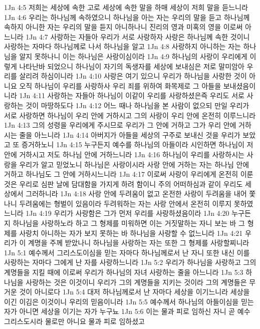 1Jn 4:5  저희는 세상에 속한 고로 세상에 속한 말을 하매 세상이 저희 말을 듣느니라
1Jn 4:6  우리는 하나님께 속하였으니 하나님을 아는 자는 우리의 말을 듣고 하나님께 속하지 아니한 자는 우리의 말을 듣지 아니하나니 진리의 영과 미혹의 영을 이로써 아느니라
1Jn 4:7  사랑하는 자들아 우리가 서로 사랑하자 사랑은 하나님께 속한 것이니 사랑하는 자마다 하나님께로 나서 하나님을 알고
1Jn 4:8  사랑하지 아니하는 자는 하나님을 알지 못하나니 이는 하나님은 사랑이심이라
1Jn 4:9  하나님의 사랑이 우리에게 이렇게 나타난바 되었으니 하나님이 자기의 독생자를 세상에 보내심은 저로 말미암아 우리를 살리려 하심이니라
1Jn 4:10  사랑은 여기 있으니 우리가 하나님을 사랑한 것이 아니요 오직 하나님이 우리를 사랑하사 우리 죄를 위하여 화목제로 그 아들을 보내셨음이니라
1Jn 4:11  사랑하는 자들아 하나님이 이같이 우리를 사랑하셨은즉 우리도 서로 사랑하는 것이 마땅하도다
1Jn 4:12  어느 때나 하나님을 본 사람이 없으되 만일 우리가 서로 사랑하면 하나님이 우리 안에 거하시고 그의 사랑이 우리 안에 온전히 이루느니라
1Jn 4:13  그의 성령을 우리에게 주시므로 우리가 그 안에 거하고 그가 우리 안에 거하시는 줄을 아느니라
1Jn 4:14  아버지가 아들을 세상의 구주로 보내신 것을 우리가 보았고 또 증거하노니
1Jn 4:15  누구든지 예수를 하나님의 아들이라 시인하면 하나님이 저 안에 거하시고 저도 하나님 안에 거하느니라
1Jn 4:16  하나님이 우리를 사랑하시는 사랑을 우리가 알고 믿었노니 하나님은 사랑이시라 사랑 안에 거하는 자는 하나님 안에 거하고 하나님도 그 안에 거하시느니라
1Jn 4:17  이로써 사랑이 우리에게 온전히 이룬 것은 우리로 심판 날에 담대함을 가지게 하려 함이니 주의 어떠하심과 같이 우리도 세상에서 그러하니라
1Jn 4:18  사랑 안에 두려움이 없고 온전한 사랑이 두려움을 내어 쫓나니 두려움에는 형벌이 있음이라 두려워하는 자는 사랑 안에서 온전히 이루지 못하였느니라
1Jn 4:19  우리가 사랑함은 그가 먼저 우리를 사랑하셨음이라
1Jn 4:20  누구든지 하나님을 사랑하노라 하고 그 형제를 미워하면 이는 거짓말하는 자니 보는 바 그 형제를 사랑치 아니하는 자가 보지 못하는 바 하나님을 사랑할 수 없느니라
1Jn 4:21  우리가 이 계명을 주께 받았나니 하나님을 사랑하는 자는 또한 그 형제를 사랑할찌니라
1Jn 5:1  예수께서 그리스도이심을 믿는 자마다 하나님께로서 난 자니 또한 내신 이를 사랑하는 자마다 그에게 난 자를 사랑하느니라
1Jn 5:2  우리가 하나님을 사랑하고 그의 계명들을 지킬 때에 이로써 우리가 하나님의 자녀 사랑하는 줄을 아느니라
1Jn 5:3  하나님을 사랑하는 것은 이것이니 우리가 그의 계명들을 지키는 것이라 그의 계명들은 무거운 것이 아니로다
1Jn 5:4  대저 하나님께로서 난 자마다 세상을 이기느니라 세상을 이긴 이김은 이것이니 우리의 믿음이니라
1Jn 5:5  예수께서 하나님의 아들이심을 믿는 자가 아니면 세상을 이기는 자가 누구뇨
1Jn 5:6  이는 물과 피로 임하신 자니 곧 예수 그리스도시라 물로만 아니요 물과 피로 임하셨고
